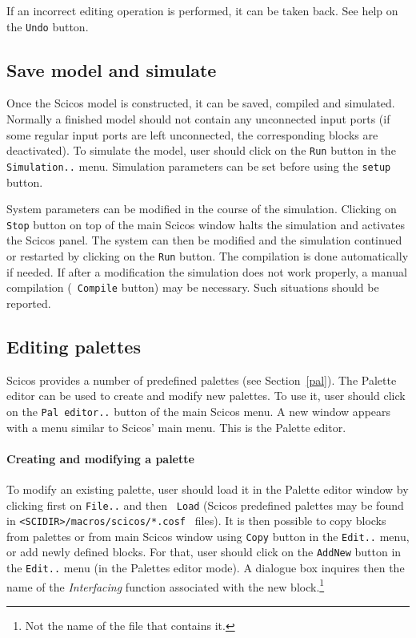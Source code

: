 \documentclass{book}
\newcommand{\interfacing}{{\em Interfacing }}
\begin{document}
If an incorrect editing operation is performed, it can be taken back. See
help on the {\tt Undo} button.

\subsection{Save model and simulate}
Once the Scicos   model is constructed, it can be saved, compiled and 
simulated. Normally a finished model should not contain any
unconnected input ports (if some regular input ports are left unconnected, the
corresponding blocks are deactivated).
To simulate the model, user should click on the {\tt Run} button in
the {\tt Simulation..} menu. Simulation parameters can be set before using
the {\tt setup} button. 

System parameters can be modified in the course of the simulation.
Clicking on {\tt Stop} button on top of the main Scicos  window halts the
simulation and activates the Scicos 
panel. The system can then be modified and the simulation 
continued or restarted by clicking on the {\tt Run} button. The
compilation is done automatically if needed. If after a modification
the simulation does not work properly, a manual compilation ({\tt
Compile} button) may be necessary. Such situations should be reported.


\subsection{Editing palettes}
Scicos provides a number of predefined palettes (see Section~\ref{pal}). The
Palette editor can be used to create and modify new palettes.
To use it, user should click on the 
{\tt Pal editor..} button of the main Scicos menu. A new 
window appears with a menu similar to Scicos' main menu. This is the
Palette editor.

\paragraph{Creating and modifying a palette}
To modify an existing palette, user should load it in the
Palette editor window by clicking first on {\tt File..} and then {\tt
Load} (Scicos predefined palettes
may be found in {\tt <SCIDIR>/macros/scicos/*.cosf } files).
It is then possible to copy blocks from palettes or from main Scicos 
window using  {\tt Copy} button in the {\tt Edit..} menu, or
add newly defined blocks. For that, user should click on the
{\tt AddNew} button in the {\tt Edit..} menu (in the Palettes editor mode).
A dialogue box inquires then the name of the \interfacing function
associated with 
the new block.\footnote{Not the name of the file that contains it.}
\end{document}
